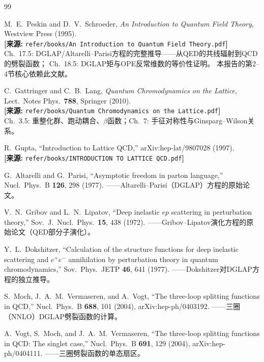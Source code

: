 \documentclass[12pt,a4paper]{ctexart}
\theoremstyle{definition}
\begin{document}
\begin{thebibliography}{99}

M.~E.~Peskin and D.~V.~Schroeder,
\textit{An Introduction to Quantum Field Theory},
Westview Press (1995).
\\\textbf{[来源:} \texttt{refer/books/An Introduction to Quantum Field Theory.pdf}\textbf{]}
\\Ch.~17.5: DGLAP/Altarelli--Parisi方程的完整推导——从QED的共线辐射到QCD的劈裂函数；
Ch.~18.5: DGLAP矩与OPE反常维数的等价性证明。
本报告的第2--4节核心依赖此文献。

C.~Gattringer and C.~B.~Lang,
\textit{Quantum Chromodynamics on the Lattice},
Lect.\ Notes Phys.\ \textbf{788}, Springer (2010).
\\\textbf{[来源:} \texttt{refer/books/Quantum Chromodynamics on the Lattice.pdf}\textbf{]}
\\Ch.~3.5: 重整化群、跑动耦合、$\beta$函数；Ch.~7: 手征对称性与Ginsparg--Wilson关系。

R.~Gupta,
``Introduction to Lattice QCD,''
arXiv:hep-lat/9807028 (1997).
\\\textbf{[来源:} \texttt{refer/books/INTRODUCTION TO LATTICE QCD.pdf}\textbf{]}

G.~Altarelli and G.~Parisi,
``Asymptotic freedom in parton language,''
Nucl.\ Phys.\ B \textbf{126}, 298 (1977).
——Altarelli--Parisi（DGLAP）方程的原始论文。

V.~N.~Gribov and L.~N.~Lipatov,
``Deep inelastic $ep$ scattering in perturbation theory,''
Sov.\ J.\ Nucl.\ Phys.\ \textbf{15}, 438 (1972).
——Gribov--Lipatov演化方程的原始论文（QED部分子演化）。

Y.~L.~Dokshitzer,
``Calculation of the structure functions for deep inelastic scattering and $e^+e^-$ annihilation by perturbation theory in quantum chromodynamics,''
Sov.\ Phys.\ JETP \textbf{46}, 641 (1977).
——Dokshitzer对DGLAP方程的独立推导。

S.~Moch, J.~A.~M.~Vermaseren, and A.~Vogt,
``The three-loop splitting functions in QCD,''
Nucl.\ Phys.\ B \textbf{688}, 101 (2004), arXiv:hep-ph/0403192.
——三圈（NNLO）DGLAP劈裂函数的计算。

A.~Vogt, S.~Moch, and J.~A.~M.~Vermaseren,
``The three-loop splitting functions in QCD: The singlet case,''
Nucl.\ Phys.\ B \textbf{691}, 129 (2004), arXiv:hep-ph/0404111.
——三圈劈裂函数的单态扇区。


\end{thebibliography}
\end{document}

